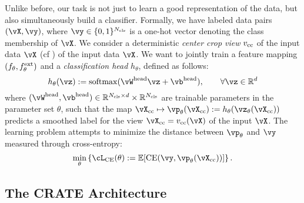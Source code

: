 \documentclass[\toplevelprefix/book-main.tex]{subfiles}
\begin{document}
Unlike before, our task is not just to learn a good representation of the data, but also simultaneously build a classifier. Formally, we have labeled data pairs \((\vX, \vy)\), where \(\vy \in \{0, 1\}^{N_{\cls}}\) is a one-hot vector denoting the class membership of \(\vX\). We consider a deterministic \textit{center crop view} \(v_{\mathrm{cc}}\) of the input data \(\vX\) (cf ) of the input data \(\vX\). We want to jointly train a feature mapping \((f_{\theta}, f_{\theta}^{\mathrm{ext}})\) and a \textit{classification head} \(h_{\theta}\), defined as follows:
\begin{equation}
    h_{\theta}(\vz) := \softmax(\vW^{\head}\vz + \vb^{\head}), \qquad  \forall \vz \in \R^{d}
\end{equation}
where \((\vW^{\head}, \vb^{\head}) \in \R^{N_{\cls} \times d} \times \R^{N_{\cls}}\) are trainable parameters in the parameter set \(\theta\), such that the map \(\vX_{\cc} \mapsto \vp_{\theta}(\vX_{\cc}) := h_{\theta}(\vz_{\theta}(\vX_{\cc}))\) predicts a smoothed label for the view \(\vX_{\cc} = v_{\cc}(\vX)\) of the input \(\vX\). The learning problem attempts to minimize the distance between \(\vp_{\theta}\) and \(\vy\) measured through cross-entropy:
\begin{equation}\label{eq:classification_ce_loss}
    \min_{\theta}\bc{\cL_{\CE}(\theta) := \Ex[\CE(\vy, \vp_{\theta}(\vX_{\cc}))]}.
\end{equation}


\subsection{The CRATE Architecture}\label{sub:image_classification_architecture}
\end{document}
